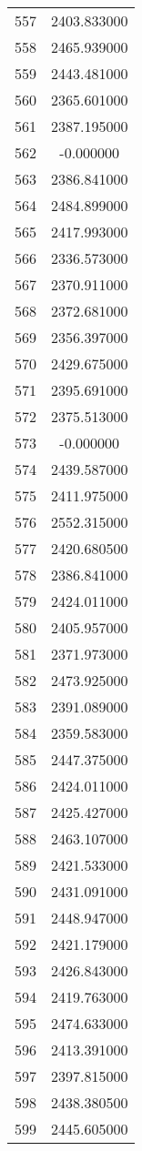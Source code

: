 \documentclass[12pt]{article}
\begin{document}
\begin{longtable}{@{}cc@{}}
557 & 2403.833000 \\
558 & 2465.939000 \\
559 & 2443.481000 \\
560 & 2365.601000 \\
561 & 2387.195000 \\
562 & -0.000000 \\
563 & 2386.841000 \\
564 & 2484.899000 \\
565 & 2417.993000 \\
566 & 2336.573000 \\
567 & 2370.911000 \\
568 & 2372.681000 \\
569 & 2356.397000 \\
570 & 2429.675000 \\
571 & 2395.691000 \\
572 & 2375.513000 \\
573 & -0.000000 \\
574 & 2439.587000 \\
575 & 2411.975000 \\
576 & 2552.315000 \\
577 & 2420.680500 \\
578 & 2386.841000 \\
579 & 2424.011000 \\
580 & 2405.957000 \\
581 & 2371.973000 \\
582 & 2473.925000 \\
583 & 2391.089000 \\
584 & 2359.583000 \\
585 & 2447.375000 \\
586 & 2424.011000 \\
587 & 2425.427000 \\
588 & 2463.107000 \\
589 & 2421.533000 \\
590 & 2431.091000 \\
591 & 2448.947000 \\
592 & 2421.179000 \\
593 & 2426.843000 \\
594 & 2419.763000 \\
595 & 2474.633000 \\
596 & 2413.391000 \\
597 & 2397.815000 \\
598 & 2438.380500 \\
599 & 2445.605000 \\

\end{longtable}
\end{document}
